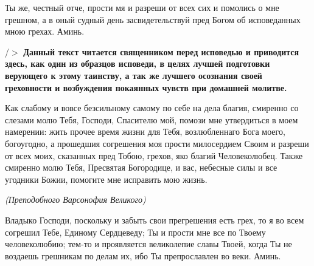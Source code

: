 Ты же, честный отче, прости мя и разреши от всех сих и помолись о мне грешном, а в оный судный день засвидетельствуй пред Богом об исповеданных мною грехах. Аминь. 

/$>$\bfseries *\normalfont{} Данный текст читается священником перед исповедью и приводится здесь, как один из образцов исповеди, в целях лучшей подготовки верующего к этому таинству, а так же лучшего осознания своей греховности и возбуждения покаянных чувств при домашней молитве. 

 

 

 

 

\mychapterending

 


Как слабому и вовсе безсильному самому по себе на дела благия, смиренно со слезами молю Тебя, Господи, Спасителю мой, помози мне утвердиться в моем намерении: жить прочее время жизни для Тебя, возлюбленнаго Бога моего, богоугодно, а прошедшия согрешения моя прости милосердием Своим и разреши от всех моих, сказанных пред Тобою, грехов, яко благий Человеколюбец. Также смиренно молю Тебя, Пресвятая Богородице, и вас, небесные силы и все угодники Божии, помогите мне исправить мою жизнь.\itshape  

\normalfont{} 
\mychapterending

 


\itshape (Преподобного Варсонофия Великого) 

\normalfont{}

Владыко Господи, поскольку и забыть свои прегрешения есть грех, то я во всем согрешил Тебе, Единому Сердцеведу; Ты и прости мне все по Твоему человеколюбию; тем-то и проявляется великолепие славы Твоей, когда Ты не воздаешь грешникам по делам их, ибо Ты препрославлен во веки. Аминь. 
\mychapterending
